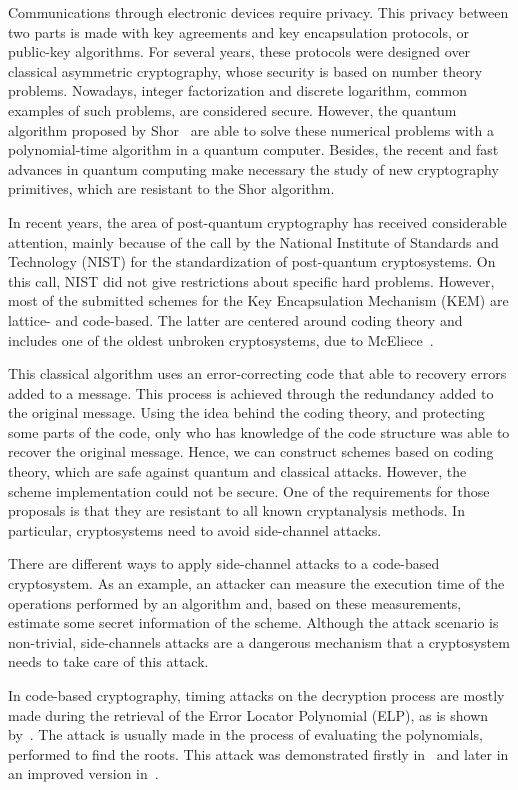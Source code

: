Communications through electronic devices require privacy. This privacy between two parts is made with key agreements and key encapsulation protocols, or public-key algorithms. For several years, these protocols were designed over classical asymmetric cryptography, whose security is based on number theory problems. Nowadays, integer factorization and discrete logarithm, common examples of such problems, are considered secure. However, the quantum algorithm proposed by Shor~\cite{shor1999polynomial} are able to solve these numerical problems with a polynomial-time algorithm in a quantum computer. Besides, the recent and fast advances in quantum computing make necessary the study of new cryptography primitives, which are resistant to the Shor algorithm. 

In recent years, the area of post-quantum cryptography has received considerable attention, mainly because of the call by the National Institute of Standards and Technology (NIST) for the standardization of post-quantum cryptosystems. On this call, NIST did not give restrictions about specific hard problems. However, most of the submitted schemes for the Key Encapsulation Mechanism (KEM) are lattice- and code-based. The latter are centered around coding theory and includes one of the oldest unbroken cryptosystems, due to McEliece~\cite{mceliece1978public}.

This classical algorithm uses an error-correcting code that able to recovery errors added to a message. This process is achieved through the redundancy added to the original message. Using the idea behind the coding theory, and protecting some parts of the code, only who has knowledge of the code structure was able to recover the original message. Hence, we can construct schemes based on coding theory, which are safe against quantum and classical attacks. However, the scheme implementation could not be secure. One of the requirements for those proposals is that they are resistant to all known cryptanalysis methods. In particular, cryptosystems need to avoid side-channel attacks.

There are different ways to apply side-channel attacks to a code-based cryptosystem. As an example, an attacker can measure the execution time of the operations performed by an algorithm and, based on these measurements, estimate some secret information of the scheme. Although the attack scenario is non-trivial, side-channels attacks are a dangerous mechanism that a cryptosystem needs to take care of this attack.
 
In code-based cryptography, timing attacks on the decryption process are mostly made during the retrieval of the Error Locator Polynomial (ELP), as is shown by~\cite{shoufan2009timing}. The attack is usually made in the process of evaluating the polynomials, performed to find the roots. This attack was demonstrated firstly in~\cite{shoufan2009timing} and later in an improved version in~\cite{bucerzan2017improved}.

